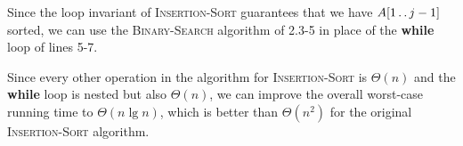 
Since the loop invariant of \textsc{Insertion-Sort} guarantees that we have 
$A[1 \mathinner{{\ldotp}\,{\ldotp}} j - 1]$ sorted, we can use the \textsc{Binary-Search} algorithm
of 2.3-5 in place of the \textbf{while} loop of lines 5-7.

Since every other operation in the algorithm for \textsc{Insertion-Sort} is
$\Theta(n)$ and the \textbf{while} loop is nested but also $\Theta(n)$, we can
improve the overall worst-case running time to $\Theta(n\lg{n})$, which is better 
than $\Theta(n^2)$ for the original \textsc{Insertion-Sort} algorithm.
